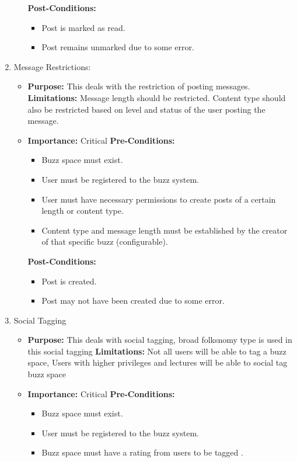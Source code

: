 \documentclass[11pt]{article}
\begin{document}
\begin{enumerate}
\begin{itemize}
\textbf{Post-Conditions: }
	\begin{itemize}
	\item Post is marked as read.
	\item Post remains unmarked due to some error.
	\end{itemize}

\end{itemize}


\item Message Restrictions: 
\begin{itemize}
\item \textbf{Purpose:}
This deals with the restriction of posting messages.
\newline
\textbf{Limitations:} 
Message length should be restricted. Content type should also be restricted based on level and status of the user posting the message.

\item \textbf{Importance:} Critical\newline
\textbf{Pre-Conditions: }
	\begin{itemize}
	\item Buzz space must exist.
	\item User must be registered to the buzz system.
	\item User must have necessary permissions to create posts of a 		certain length or content type.
	\item Content type and message length must be established by the 		creator of that specific buzz (configurable).
	\end{itemize}

\textbf{Post-Conditions: }
	\begin{itemize}
	\item Post is created.
	\item Post may not have been created due to some error.
	\end{itemize}
\end{itemize}


\item Social Tagging 
\begin{itemize}
\item \textbf{Purpose:}
This deals with social tagging, broad folksnomy type is used
in this social tagging
\newline
\textbf{Limitations:} 
Not all users will be able to tag a buzz
space, Users with higher privileges and lectures will be able to social
tag buzz space

\item \textbf{Importance:} Critical\newline
\textbf{Pre-Conditions: }
	\begin{itemize}
	\item Buzz space must exist.
	\item User must be registered to the buzz system.
	\item Buzz space must have a rating from users to be tagged .
	\end{itemize}


\end{itemize}
\end{enumerate}
\end{document}
